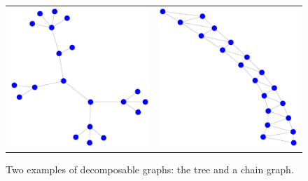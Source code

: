 \begin{figure}[h!]
\centering
\begin{tabular}{ll}
\includegraphics[angle=0, scale=0.4]{chordalGraph_tree_graph.eps} &
\includegraphics[angle=0, scale=0.4]{chordalGraph_chain_graph.eps}
\end{tabular}
\caption{Two examples of decomposable graphs: the tree and a chain graph. }
\label{figSM:examplesOfChordalGraph}
\end{figure}



